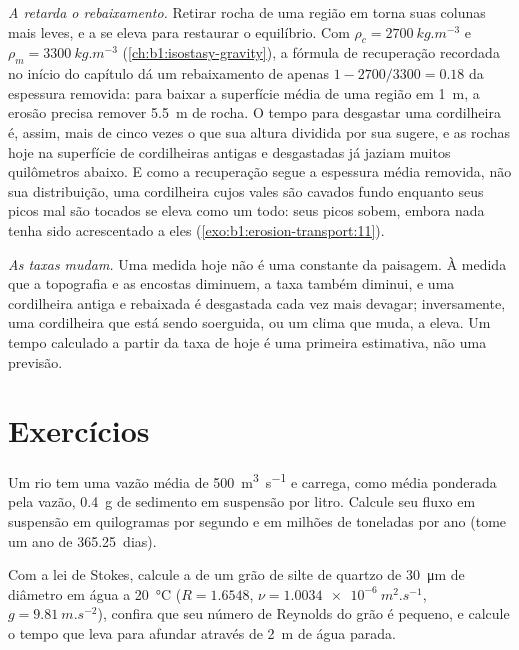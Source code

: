 \emph{A  retarda o rebaixamento.} Retirar rocha de uma região em  torna suas colunas mais leves, e a  se eleva para restaurar o equilíbrio. Com $\rho_c
= \qty{2700}{kg.m^{-3}}$ e $\rho_m = \qty{3300}{kg.m^{-3}}$ (\cref{ch:b1:isostasy-gravity}), a fórmula de recuperação recordada no início do capítulo dá um rebaixamento de apenas $1 - 2700/3300 = 0.18$ da espessura removida: para baixar a superfície média de uma região em \qty{1}{m}, a erosão precisa remover \qty{5.5}{m} de rocha. O tempo para desgastar uma cordilheira é, assim, mais de cinco vezes o que sua altura dividida por sua  sugere, e as rochas hoje na superfície de cordilheiras antigas e desgastadas já jaziam muitos quilômetros abaixo. E como a recuperação segue a espessura média removida, não sua distribuição, uma cordilheira cujos vales são cavados fundo enquanto seus picos mal são tocados se eleva como um todo: seus picos sobem, embora nada tenha sido acrescentado a eles (\cref{exo:b1:erosion-transport:11}).

\emph{As taxas mudam.} Uma  medida hoje não é uma constante da paisagem. À medida que a topografia e as encostas diminuem, a taxa também diminui, e uma cordilheira antiga e rebaixada é desgastada cada vez mais devagar; inversamente, uma cordilheira que está sendo soerguida, ou um clima que muda, a eleva. Um tempo calculado a partir da taxa de hoje é uma primeira estimativa, não uma previsão.

\section{Exercícios}

\begin{exercise}[$\star$]\label{exo:b1:erosion-transport:1}
Um rio tem uma vazão média de \qty{500}{m^3.s^{-1}} e carrega, como média ponderada pela vazão, \qty{0.4}{g} de sedimento em suspensão por litro. Calcule seu fluxo em suspensão em quilogramas por segundo e em milhões de toneladas por ano (tome um ano de \num{365.25}~dias).
\end{exercise}

\begin{exercise}[$\star$]\label{exo:b1:erosion-transport:2}
Com a lei de Stokes, calcule a  de um grão de silte de quartzo de \qty{30}{\micro m} de diâmetro em água a \qty{20}{\celsius} ($R = 1.6548$, $\nu =
\qty{1.0034e-6}{m^2.s^{-1}}$, $g = \qty{9.81}{m.s^{-2}}$), confira que seu número de Reynolds do grão é pequeno, e calcule o tempo que leva para afundar através de \qty{2}{m} de água parada.
\end{exercise}

